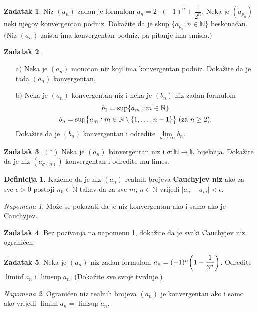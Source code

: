 \documentclass{book}
\let\originalleft\left
\let\originalright\right
\renewcommand{\left}{\mathopen{}\mathclose\bgroup\originalleft}
\renewcommand{\right}{\aftergroup\egroup\originalright}
\theoremstyle{definition}
\theoremstyle{definition}
\newtheorem{definition}{Definicija}
\newtheorem{exercise}{Zadatak}
\theoremstyle{remark}
\newtheorem{remark}{Napomena}
\begin{document}
\begin{exercise}
Niz $(a_n)$ zadan je formulom $a_n=2\cdot (-1)^n+\dfrac{1}{2^n}$. Neka je $(a_{p_n})$ neki njegov konvergentan podniz. Dokažite da je skup $\{a_{p_n} : n\in \mathbb{N}\}$ beskonačan. (Niz $(a_n)$ zaista ima konvergentan podniz, pa pitanje ima smisla.)
\end{exercise}
\begin{exercise} \textbf{}
\begin{itemize}
\item[a)] Neka je $(a_n)$ monoton niz koji ima konvergentan podniz. Dokažite da je tada $(a_n)$ konvergentan.
\item[b)] Neka je $(a_n)$ konvergentan niz i neka je $(b_n)$ niz zadan formulom
\begin{gather*}
b_1=\sup\{a_m : m\in \mathbb{N}\}\\
b_n=\sup\left\{a_m : m\in \mathbb{N}\setminus\left\{1, \dots, n-1\right\}\right\}\;(\text{za }n\geq 2).
\end{gather*}
\noindent Dokažite da je $(b_n)$ konvergentan i odredite $\lim\limits_{n\to \infty}{b_n}$.
\end{itemize}
\end{exercise}
\begin{exercise} $(*)$
Neka je $(a_n)$ konvergentan niz i $\sigma : \mathbb{N}\to \mathbb{N}$ bijekcija. Dokažite da je niz $(a_{\sigma(n)})$ konvergentan i odredite mu limes.
\end{exercise}
\begin{definition}
Kažemo da je niz $(a_n)$ realnih brojeva \textbf{Cauchyjev niz} ako za sve $\epsilon>0$ postoji $n_0\in \mathbb{N}$ takav da za sve $m$, $n\in \mathbb{N}$ vrijedi $|a_n-a_m|<\epsilon$.
\end{definition}

\begin{remark}
\label{9}
Može se pokazati da je niz konvergentan ako i samo ako je Cauchyjev.
\end{remark}

\begin{exercise}
Bez pozivanja na napomenu \ref{9}, dokažite da je svaki Cauchyjev niz ograničen.
\end{exercise}
\begin{exercise}
Neka je $(a_n)$ niz zadan formulom $a_n=(-1)^n\left(1-\dfrac{1}{3^n}\right)$. Odredite $\liminf{a_n}$ i $\limsup{a_n}$. (Dokažite sve svoje tvrdnje.)
\end{exercise}
\begin{remark}
Ograničen niz realnih brojeva $(a_n)$ je konvergentan ako i samo ako vrijedi $\liminf{a_n}=\limsup{a_n}$.
\end{remark}
\end{document}
